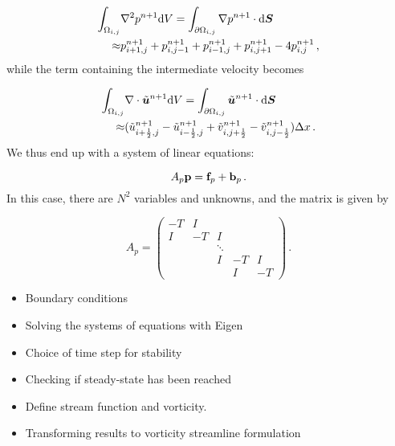 \documentclass[final,3p,twocolumn]{elsarticle}
\begin{document}
\begin{align}
    \nonumber
    \int_{\Omega_{i,j}} & \nabla^2 p^{n+1} {\rm d}V = 
    \int_{\partial \Omega_{i,j}} \nabla p^{n+1} \cdot {\rm d}\bm{S} \\
    \approx& p_{i+1,j}^{n+1} + p_{i,j-1}^{n+1} + p_{i-1,j}^{n+1} +
    p_{i,j+1}^{n+1} -4 p_{i,j}^{n+1} \,,
\end{align}
%
while the term containing the intermediate velocity becomes 

\begin{align}
    \nonumber
    \int_{\Omega_{i,j}} & \nabla \cdot \tilde{\bm{u}}^{n+1} {\rm d}V = 
    \int_{\partial \Omega_{i,j}} \tilde{\bm{u}}^{n+1} \cdot {\rm d}\bm{S} \\
    \approx& (\tilde{u}_{i+\frac{1}{2},j}^{n+1} -
    \tilde{u}_{i-\frac{1}{2},j}^{n+1} + \tilde{v}_{i,j+\frac{1}{2}}^{n+1} -
    \tilde{v}_{i,j-\frac{1}{2}}^{n+1}) \Delta x \,.
\end{align}
%
We thus end up with a system of linear equations: 

\begin{equation}
    A_p {\bf p} = {\bf f}_p + {\bf b}_p \,.
\end{equation}
%
In this case, there are $N^2$ variables and unknowns, and the matrix is given
by 

\begin{equation*}
    A_p = 
    \begin{pmatrix}
        -T & I \\
        I & -T & I \\
        & & \ddots \\ 
        & & I & -T & I \\
        & & & I & -T
    \end{pmatrix} \,.
\end{equation*}

\begin{itemize}
    \item Boundary conditions
    \item Solving the systems of equations with Eigen
    \item Choice of time step for stability
    \item Checking if steady-state has been reached
    \item Define stream function and vorticity.
    \item Transforming results to vorticity streamline formulation
\end{itemize}
\end{document}
